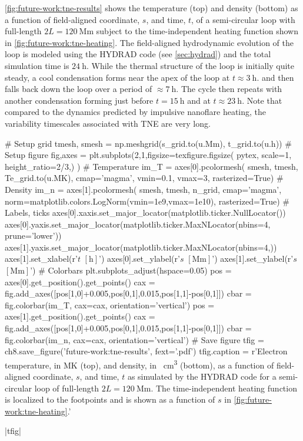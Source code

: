 \autoref{fig:future-work:tne-results} shows the temperature (top) and density (bottom) as a function of field-aligned coordinate, $s$, and time, $t$, of a semi-circular loop with full-length $2L=\SI{120}{\mega\m}$ subject to the time-independent heating function shown in \autoref{fig:future-work:tne-heating}. The field-aligned hydrodynamic evolution of the loop is modeled using the HYDRAD code (see \autoref{sec:hydrad}) and the total simulation time is $\SI{24}{\hour}$. While the thermal structure of the loop is initially quite steady, a cool condensation forms near the apex of the loop at $t\approx\SI{3}{\hour}$. and then falls back down the loop over a period of $\approx\SI{7}{\hour}$. The cycle then repeats with another condensation forming just before $t=\SI{15}{\hour}$ and at $t\approx\SI{23}{\hour}$. Note that compared to the dynamics predicted by impulsive nanoflare heating, the variability timescales associated with TNE are very long. 

\begin{pycode}[chapter8]
# Setup grid
tmesh, smesh = np.meshgrid(s_grid.to(u.Mm), t_grid.to(u.h))
# Setup figure
fig,axes = plt.subplots(2,1,figsize=texfigure.figsize(
    pytex,
    scale=1,
    height_ratio=2/3,)
)
# Temperature
im_T = axes[0].pcolormesh(
    smesh, tmesh, Te_grid.to(u.MK),
    cmap='magma',
    vmin=0.1,
    vmax=3,
    rasterized=True)
# Density
im_n = axes[1].pcolormesh(
    smesh, tmesh, n_grid,
    cmap='magma',
    norm=matplotlib.colors.LogNorm(vmin=1e9,vmax=1e10),
    rasterized=True)
# Labels, ticks
axes[0].xaxis.set_major_locator(matplotlib.ticker.NullLocator())
axes[0].yaxis.set_major_locator(matplotlib.ticker.MaxNLocator(nbins=4, prune='lower'))
axes[1].yaxis.set_major_locator(matplotlib.ticker.MaxNLocator(nbins=4,))
axes[1].set_xlabel(r'$t$ $[\si{\hour}]$')
axes[0].set_ylabel(r'$s$ $[\si{\mega\m}]$')
axes[1].set_ylabel(r'$s$ $[\si{\mega\m}]$')
# Colorbars
plt.subplots_adjust(hspace=0.05)
pos = axes[0].get_position().get_points()
cax = fig.add_axes([pos[1,0]+0.005,pos[0,1],0.015,pos[1,1]-pos[0,1]])
cbar = fig.colorbar(im_T, cax=cax, orientation='vertical')
pos = axes[1].get_position().get_points()
cax = fig.add_axes([pos[1,0]+0.005,pos[0,1],0.015,pos[1,1]-pos[0,1]])
cbar = fig.colorbar(im_n, cax=cax, orientation='vertical')
# Save figure
tfig = ch8.save_figure('future-work:tne-results', fext='.pdf')
tfig.caption = r'Electron temperature, in \si{\mega\kelvin} (top), and density, in \si{\per\cubic\cm} (bottom), as a function of field-aligned coordinate, $s$, and time, $t$ as simulated by the HYDRAD code for a semi-circular loop of full-length $2L=\SI{120}{\mega\m}$. The time-independent heating function is localized to the footpoints and is shown as a function of $s$ in \autoref{fig:future-work:tne-heating}.'
\end{pycode}
\py[chapter8]|tfig|

